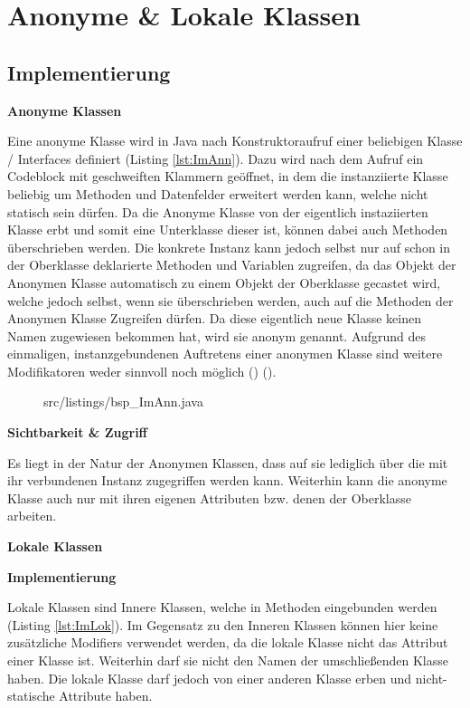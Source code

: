 \section{Anonyme \& Lokale Klassen}
\subsection {Implementierung}

{\Large \bf Anonyme Klassen}

Eine anonyme Klasse wird in Java nach Konstruktoraufruf einer beliebigen Klasse / Interfaces definiert (Listing \ref{lst:ImAnn}).
Dazu wird nach dem Aufruf ein Codeblock mit geschweiften Klammern geöffnet, in dem die instanziierte Klasse beliebig um Methoden und Datenfelder erweitert werden kann, welche nicht statisch sein dürfen.
Da die Anonyme Klasse von der eigentlich instaziierten Klasse erbt und somit eine Unterklasse dieser ist, können dabei auch Methoden überschrieben werden.
Die konkrete Instanz kann jedoch selbst nur auf schon in der Oberklasse deklarierte Methoden und Variablen zugreifen, da das Objekt der Anonymen Klasse automatisch zu einem Objekt der Oberklasse gecastet wird, welche jedoch selbst, wenn sie überschrieben werden, auch auf die Methoden der Anonymen Klasse Zugreifen dürfen.
Da diese eigentlich neue Klasse keinen Namen zugewiesen bekommen hat, wird sie anonym genannt.
Aufgrund des einmaligen, instanzgebundenen Auftretens einer anonymen Klasse sind weitere Modifikatoren weder sinnvoll noch möglich (\cite{goll2013java}) (\cite{Oracle:JLS9}).

\begin{figure}[h]
\lstset{language=Java}
 {src/listings/bsp_ImAnn.java}
\end{figure}

{\bf Sichtbarkeit \& Zugriff}

Es liegt in der Natur der Anonymen Klassen, dass auf sie lediglich über die mit ihr verbundenen Instanz zugegriffen werden kann.
Weiterhin kann die anonyme Klasse auch nur mit ihren eigenen Attributen bzw. denen der Oberklasse arbeiten.

\newpage

{\Large \bf Lokale Klassen}

{\bf Implementierung}

Lokale Klassen sind Innere Klassen, welche in Methoden eingebunden werden (Listing \ref{lst:ImLok}).
Im Gegensatz zu den Inneren Klassen können hier keine zusätzliche Modifiers verwendet werden, da die lokale Klasse nicht das Attribut einer Klasse ist.
Weiterhin darf sie nicht den Namen der umschließenden Klasse haben.
Die lokale Klasse darf jedoch von einer anderen Klasse erben und nicht-statische Attribute haben.

